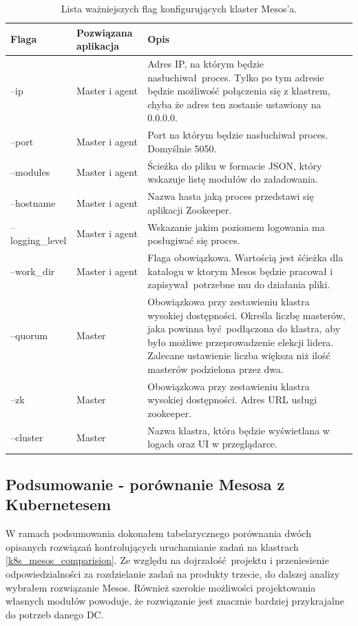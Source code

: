 \documentclass[10pt,a4paper,titlepage,twoside]{report}
\begin{document}
\begin{table}[!htbp]
\caption{Lista ważniejszych flag konfigurujących klaster Mesos'a.}
\label{mesos_flags}
\centering
\begin{tabular}{|p{3cm}|p{3cm}|p{8cm}|}
  \hline
  \textbf{Flaga} & \textbf{Pozwiązana aplikacja} & \textbf{Opis}\\
  \hline
  --ip & Master i agent & Adres IP, na którym będzie nasłuchiwał proces. Tylko po tym adresie będzie możliwość połączenia się z klastrem, chyba że adres ten zostanie ustawiony na 0.0.0.0. \\
  \hline
  --port & Master i agent & Port na którym będzie nasłuchiwał proces. Domyślnie 5050. \\
  \hline
  --modules & Master i agent & Ścieżka do pliku w formacie JSON, który wskazuje listę modułów do załadowania. \\
  \hline
  --hostname & Master i agent & Nazwa hasta jaką proces przedstawi się aplikacji Zookeeper. \\
  \hline
  --logging\_level & Master i agent & Wskazanie jakim poziomem logowania ma posługiwać się proces.  \\
  \hline
  --work\_dir & Master i agent & Flaga obowiązkowa. Wartością jest śćieżka dla katalogu w ktorym Mesos będzie pracował i zapisywał potrzebne mu do działania pliki. \\
  \hline
  --quorum & Master & Obowiązkowa przy zestawieniu klastra wysokiej dostępności. Określa liczbę masterów, jaka powinna być podłączona do klastra, aby było możliwe przeprowadzenie elekcji lidera. Zalecane ustawienie liczba większa niż ilość masterów podzielona przez dwa. \\
  \hline
  --zk & Master & Obowiązkowa przy zestawieniu klastra wysokiej dostępności. Adres URL usługi zookeeper. \\
  \hline
  --cluster & Master & Nazwa klastra, która będzie wyświetlana w logach oraz UI w przeglądarce. \\
  \hline
\end{tabular}
\end{table}

\subsection{Podsumowanie - porównanie Mesosa z Kubernetesem}
W ramach podsumowania dokonałem tabelarycznego porównania dwóch opisanych rozwiązań kontrolujących uruchamianie zadań na klastrach \ref{k8s_mesos_comparision}. Ze względu na dojrzałość projektu i przeniesienie odpowiedzialności za rozdzielanie zadań na produkty trzecie, do dalszej analizy wybrałem rozwiązanie Mesos. Również szerokie możliwości projektowania własnych modułów powoduje, że rozwiązanie jest znacznie bardziej przykrajalne do potrzeb danego DC.
\end{document}
